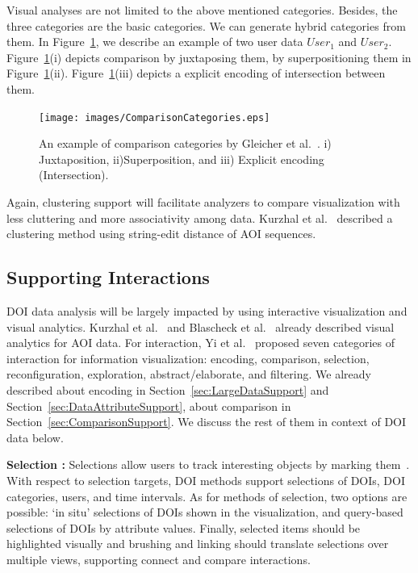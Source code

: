 Visual analyses are not limited to the above mentioned categories. Besides, the three categories are the basic categories. We can generate hybrid categories from them. In Figure~\ref{fig:ComparisonCategories}, we describe an example of two user data $User_1$ and $User_2$. Figure~\ref{fig:ComparisonCategories}(i) depicts comparison by juxtaposing them, by superpositioning them in Figure~\ref{fig:ComparisonCategories}(ii). Figure~\ref{fig:ComparisonCategories}(iii) depicts a explicit encoding of intersection between them.  
\begin{figure}[htbp]
  \centering
  \texttt{[image: images/ComparisonCategories.eps]}
  \caption{An example of comparison categories by Gleicher et al.~\cite{Glei11}. i) Juxtaposition, ii)Superposition, and iii) Explicit encoding (Intersection).}
	\label{fig:ComparisonCategories}
\end{figure}

Again, clustering support will facilitate analyzers to compare visualization with less cluttering and more associativity among data. Kurzhal et al.~\cite{Kur14} described a clustering method using string-edit distance of AOI sequences. 

\subsection{Supporting Interactions}
DOI data analysis will be largely impacted by using interactive visualization and visual analytics. Kurzhal et al.~\cite{Kur14} and Blascheck et al.~\cite{Bla16} already described visual analytics for AOI data. For interaction, Yi et al.~\cite{Yi07} proposed seven categories of interaction for information visualization: encoding, comparison, selection, reconfiguration, exploration, abstract/elaborate, and filtering. We already described about encoding in Section~\ref{sec:LargeDataSupport} and Section~\ref{sec:DataAttributeSupport}, about comparison in Section~\ref{sec:ComparisonSupport}. We discuss the rest of them in context of DOI data below. 

\noindent \textbf{Selection :} Selections allow users to track interesting objects by marking them~\cite{Yi07}. With respect to selection targets, DOI methods support selections of DOIs, DOI categories, users, and time intervals.  As for methods of selection, two options are possible: `in situ' selections of DOIs shown in the visualization, and query-based selections of DOIs by attribute values. Finally, selected items should be highlighted visually and brushing and linking should translate selections over multiple views, supporting connect and compare interactions. 


